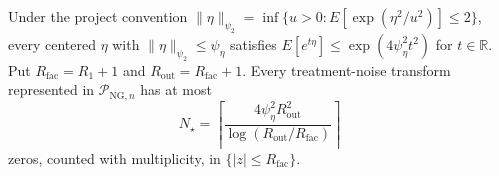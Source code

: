 Under the project convention \(\|\eta\|_{\psi_2}=\inf\{u>0:E[\exp(\eta^2/u^2)]\le2\}\), every centered \(\eta\) with \(\|\eta\|_{\psi_2}\le\psi_{\eta}\) satisfies \(E[e^{t\eta}]\le\exp(4\psi_{\eta}^2t^2)\) for \(t\in\mathbb R\).  Put \(R_{\mathrm{fac}}=R_1+1\) and \(R_{\mathrm{out}}=R_{\mathrm{fac}}+1\).  Every treatment-noise transform represented in \(\mathcal P_{\mathrm{NG},n}\) has at most
\[
 N_{\star}=\left\lceil\frac{4\psi_{\eta}^2R_{\mathrm{out}}^2}{\log(R_{\mathrm{out}}/R_{\mathrm{fac}})}\right\rceil
\]
zeros, counted with multiplicity, in \(\{|z|\le R_{\mathrm{fac}}\}\).